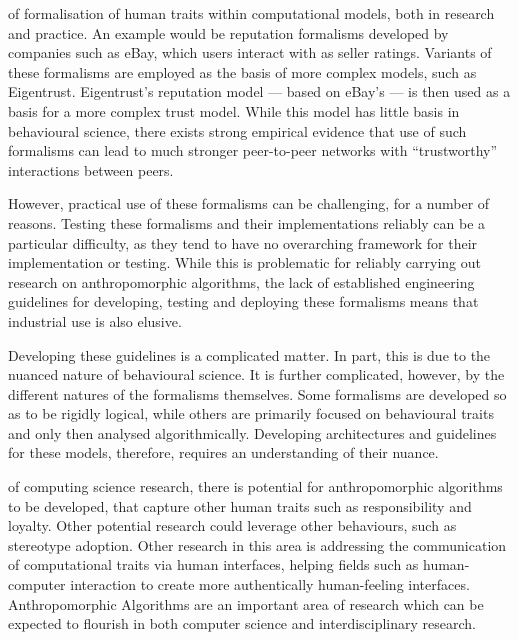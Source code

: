  of formalisation of human traits within computational models, both in research and practice. An example would be reputation formalisms developed by companies such as eBay, which users interact with as seller ratings. Variants of these formalisms are employed as the basis of more complex models, such as Eigentrust\cite{kamvar2003eigentrust}. Eigentrust's reputation model --- based on eBay's --- is then used as a basis for a more complex trust model. While this model has little basis in behavioural science, there exists strong empirical evidence that use of such formalisms can lead to much stronger peer-to-peer networks with ``trustworthy'' interactions between peers.\par

However, practical use of these formalisms can be challenging, for a number of reasons. Testing these formalisms and their implementations reliably can be a particular difficulty, as they tend to have no overarching framework for their implementation or testing\cite{Chandrasekaran2011}. While this is problematic for reliably carrying out research on anthropomorphic algorithms, the lack of established engineering guidelines for developing, testing and deploying these formalisms means that industrial use is also elusive.\par

Developing these guidelines is a complicated matter. In part, this is due to the nuanced nature of behavioural science. It is further complicated, however, by the different natures of the formalisms themselves. Some formalisms are developed so as to be rigidly logical\cite{Castelfranchi}, while others are primarily focused on behavioural traits and only then analysed algorithmically\cite{marsh1994}. Developing architectures and guidelines for these models, therefore, requires an understanding of their nuance.\par

 of computing science research, there is potential for anthropomorphic algorithms to be developed, that capture other human traits such as responsibility and loyalty. Other potential research could leverage other behaviours, such as stereotype adoption. Other research in this area is addressing the communication of computational traits via human interfaces\cite{storer_poster_paper}, helping fields such as human-computer interaction to create more authentically human-feeling interfaces. Anthropomorphic Algorithms are an important area of research which can be expected to flourish in both computer science and interdisciplinary research.\par

